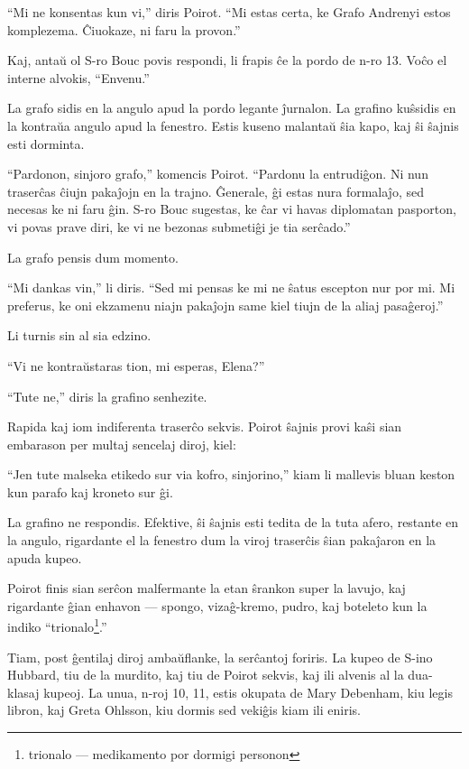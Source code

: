 ``Mi ne konsentas kun vi,'' diris Poirot. ``Mi estas certa, ke Grafo Andrenyi estos komplezema. Ĉiuokaze, ni faru la provon.''

Kaj, antaŭ ol S-ro Bouc povis respondi, li frapis ĉe la pordo de n-ro 13. Voĉo el interne alvokis, ``Envenu.''

La grafo sidis en la angulo apud la pordo legante ĵurnalon. La grafino kuŝsidis en la kontraŭa angulo apud la fenestro. Estis kuseno malantaŭ ŝia kapo, kaj ŝi ŝajnis esti dorminta.

``Pardonon, sinjoro grafo,'' komencis Poirot. ``Pardonu la entrudiĝon. Ni nun traserĉas ĉiujn pakaĵojn en la trajno. Ĝenerale, ĝi estas nura formalaĵo, sed necesas ke ni faru ĝin. S-ro Bouc sugestas, ke ĉar vi havas diplomatan pasporton, vi povas prave diri, ke vi ne bezonas submetiĝi je tia serĉado.''

La grafo pensis dum momento.

``Mi dankas vin,'' li diris. ``Sed mi pensas ke mi ne ŝatus escepton nur por mi. Mi preferus, ke oni ekzamenu niajn pakaĵojn same kiel tiujn de la aliaj pasaĝeroj.''

Li turnis sin al sia edzino.

``Vi ne kontraŭstaras tion, mi esperas, Elena?''

``Tute ne,'' diris la grafino senhezite.

Rapida kaj iom indiferenta traserĉo sekvis. Poirot ŝajnis provi kaŝi sian embarason per multaj sencelaj diroj, kiel:

``Jen tute malseka etikedo sur via kofro, sinjorino,'' kiam li mallevis bluan keston kun parafo kaj kroneto sur ĝi.

La grafino ne respondis. Efektive, ŝi ŝajnis esti tedita de la tuta afero, restante en la angulo, rigardante el la fenestro dum la viroj traserĉis ŝian pakaĵaron en la apuda kupeo.

Poirot finis sian serĉon malfermante la etan ŝrankon super la lavujo, kaj rigardante ĝian enhavon --- spongo, vizaĝ-kremo, pudro, kaj boteleto kun la indiko ``trionalo\footnote{trionalo --- medikamento por dormigi personon}.''

Tiam, post ĝentilaj diroj ambaŭflanke, la serĉantoj foriris. La kupeo de S-ino Hubbard, tiu de la murdito, kaj tiu de Poirot sekvis, kaj ili alvenis al la dua-klasaj kupeoj. La unua, n-roj 10, 11, estis okupata de Mary Debenham, kiu legis libron, kaj Greta Ohlsson, kiu dormis sed vekiĝis kiam ili eniris.

